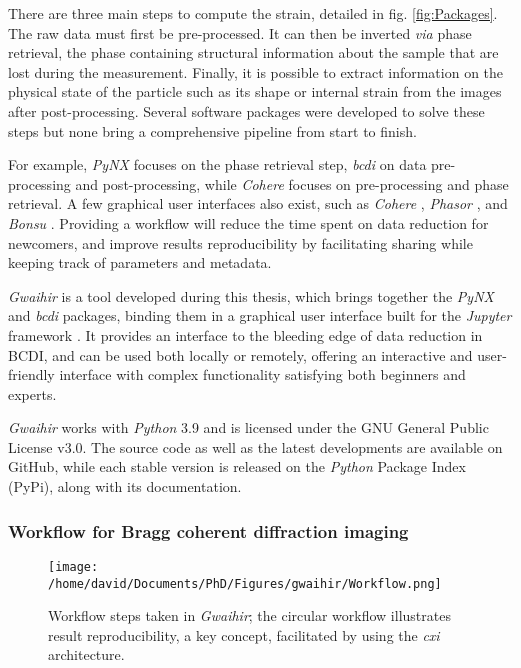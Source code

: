There are three main steps to compute the strain, detailed in fig. \ref{fig:Packages}.
The raw data must first be pre-processed.
It can then be inverted \textit{via} phase retrieval, the phase containing structural information about the sample that are lost during the measurement.
Finally, it is possible to extract information on the physical state of the particle such as its shape or internal strain from the images after post-processing.
Several software packages were developed to solve these steps but none bring a comprehensive pipeline from start to finish.

For example, \textit{PyNX} \parencite{FavreNicolin2011} focuses on the phase retrieval step, \textit{bcdi} \parencite{Carnis2021c} on data pre-processing and post-processing, while \textit{Cohere} \parencite{Frosik2021} focuses on pre-processing and phase retrieval.
A few graphical user interfaces also exist, such as \textit{Cohere} \parencite{Frosik2021}, \textit{Phasor} \parencite{Dzhigaev2021}, and \textit{Bonsu} \parencite{Newton2012}.
Providing a workflow will reduce the time spent on data reduction for newcomers, and improve results reproducibility by facilitating sharing while keeping track of parameters and metadata.

\textit{Gwaihir} is a tool developed during this thesis, which brings together the \textit{PyNX} and \textit{bcdi} packages, binding them in a graphical user interface built for the \textit{Jupyter} framework \parencite{Kluyver2016}.
It provides an interface to the bleeding edge of data reduction in BCDI, and can be used both locally or remotely, offering an interactive and user-friendly interface with complex functionality satisfying both beginners and experts.

\textit{Gwaihir} works with \textit{Python} 3.9 and is licensed under the GNU General Public License v3.0.
The source code as well as the latest developments are available on GitHub, while each stable version is released on the \textit{Python} Package Index (PyPi), along with its documentation.

\subsubsection{Workflow for Bragg coherent diffraction imaging} \label{sec:Workflow}

\begin{figure}[!htb]
    \centering
    \texttt{[image: /home/david/Documents/PhD/Figures/gwaihir/Workflow.png]}
    \caption{Workflow steps taken in \textit{Gwaihir}; the circular workflow illustrates result reproducibility, a key concept, facilitated by using the \textit{cxi} architecture.}
    \label{fig:Workflow}
\end{figure}


